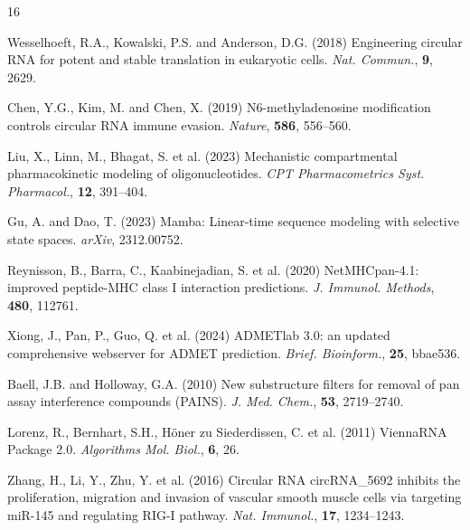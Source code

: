 \documentclass{article}
\begin{document}






\appendix



\begin{thebibliography}{16}

Wesselhoeft, R.A., Kowalski, P.S. and Anderson, D.G. (2018)
Engineering circular RNA for potent and stable translation in eukaryotic cells.
\textit{Nat. Commun.}, \textbf{9}, 2629.

Chen, Y.G., Kim, M. and Chen, X. (2019)
N6-methyladenosine modification controls circular RNA immune evasion.
\textit{Nature}, \textbf{586}, 556--560.

Liu, X., Linn, M., Bhagat, S. et al. (2023)
Mechanistic compartmental pharmacokinetic modeling of oligonucleotides.
\textit{CPT Pharmacometrics Syst. Pharmacol.}, \textbf{12}, 391--404.

Gu, A. and Dao, T. (2023)
Mamba: Linear-time sequence modeling with selective state spaces.
\textit{arXiv}, 2312.00752.

Reynisson, B., Barra, C., Kaabinejadian, S. et al. (2020)
NetMHCpan-4.1: improved peptide-MHC class I interaction predictions.
\textit{J. Immunol. Methods}, \textbf{480}, 112761.

Xiong, J., Pan, P., Guo, Q. et al. (2024)
ADMETlab 3.0: an updated comprehensive webserver for ADMET prediction.
\textit{Brief. Bioinform.}, \textbf{25}, bbae536.

Baell, J.B. and Holloway, G.A. (2010)
New substructure filters for removal of pan assay interference compounds (PAINS).
\textit{J. Med. Chem.}, \textbf{53}, 2719--2740.

Lorenz, R., Bernhart, S.H., H\"oner zu Siederdissen, C. et al. (2011)
ViennaRNA Package 2.0.
\textit{Algorithms Mol. Biol.}, \textbf{6}, 26.

Zhang, H., Li, Y., Zhu, Y. et al. (2016)
Circular RNA circRNA\_5692 inhibits the proliferation, migration and invasion of vascular smooth muscle cells via targeting miR-145 and regulating RIG-I pathway.
\textit{Nat. Immunol.}, \textbf{17}, 1234--1243.


\end{thebibliography}
\end{document}
